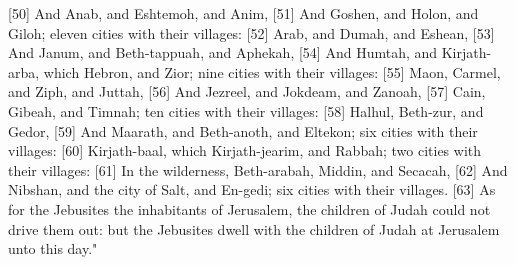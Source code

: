 [50] \textcolor[cmyk]{0.99998,1,0,0}{And Anab, and Eshtemoh, and Anim,}
[51] \textcolor[cmyk]{0.99998,1,0,0}{And Goshen, and Holon, and Giloh; eleven cities with their villages:}
[52] \textcolor[cmyk]{0.99998,1,0,0}{Arab, and Dumah, and Eshean,}
[53] \textcolor[cmyk]{0.99998,1,0,0}{And Janum, and Beth-tappuah, and Aphekah,}
[54] \textcolor[cmyk]{0.99998,1,0,0}{And Humtah, and Kirjath-arba, which   Hebron, and Zior; nine cities with their villages:}
[55] \textcolor[cmyk]{0.99998,1,0,0}{Maon, Carmel, and Ziph, and Juttah,}
[56] \textcolor[cmyk]{0.99998,1,0,0}{And Jezreel, and Jokdeam, and Zanoah,}
[57] \textcolor[cmyk]{0.99998,1,0,0}{Cain, Gibeah, and Timnah; ten cities with their villages:}
[58] \textcolor[cmyk]{0.99998,1,0,0}{Halhul, Beth-zur, and Gedor,}
[59] \textcolor[cmyk]{0.99998,1,0,0}{And Maarath, and Beth-anoth, and Eltekon; six cities with their villages:}
[60] \textcolor[cmyk]{0.99998,1,0,0}{Kirjath-baal, which   Kirjath-jearim, and Rabbah; two cities with their villages:}
[61] \textcolor[cmyk]{0.99998,1,0,0}{In the wilderness, Beth-arabah, Middin, and Secacah,}
[62] \textcolor[cmyk]{0.99998,1,0,0}{And Nibshan, and the city of Salt, and En-gedi; six cities with their villages.}
[63] \textcolor[cmyk]{0.99998,1,0,0}{As for the Jebusites the inhabitants of Jerusalem, the children of Judah could not drive them out: but the Jebusites dwell with the children of Judah at Jerusalem unto this day."}
